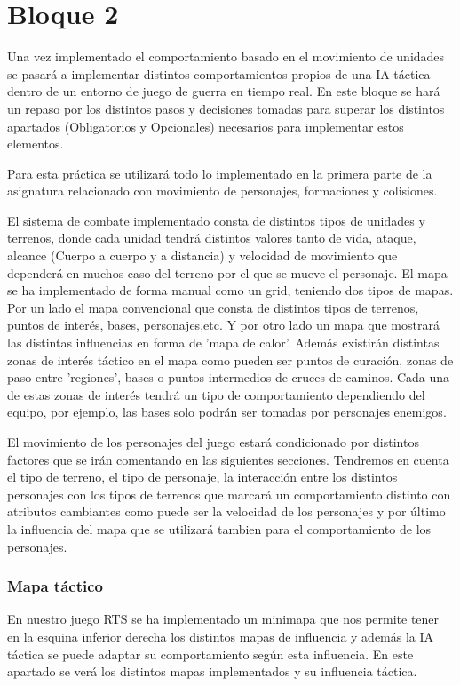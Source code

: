 \part{Bloque 2}

 Una vez implementado el comportamiento basado  en el movimiento de unidades se pasará a implementar distintos comportamientos propios de una IA táctica dentro de un entorno de juego de guerra en tiempo real.  En este bloque se hará un repaso por los distintos pasos y decisiones tomadas para superar los distintos apartados (Obligatorios y Opcionales) necesarios para implementar estos elementos.

Para esta práctica se utilizará todo lo implementado en la primera parte de la asignatura relacionado con movimiento de personajes, formaciones y colisiones.

El sistema de combate implementado consta de distintos tipos de unidades y terrenos, donde cada unidad tendrá distintos valores tanto de vida, ataque, alcance (Cuerpo a cuerpo y a distancia) y velocidad de movimiento que dependerá en muchos caso del terreno por el que se mueve el personaje. El mapa se ha implementado de forma manual como un grid, teniendo dos tipos de mapas. Por un lado el mapa convencional que consta de distintos tipos de terrenos, puntos de interés, bases, personajes,etc. Y por otro lado un mapa que mostrará las distintas influencias en forma de 'mapa de calor'.
Además  existirán distintas zonas de interés táctico en el mapa como pueden ser puntos de curación, zonas de paso entre 'regiones', bases o puntos intermedios de cruces de caminos. Cada una de estas zonas de interés tendrá un tipo de comportamiento dependiendo del equipo, por ejemplo, las bases solo podrán ser tomadas por personajes enemigos.

El movimiento de los personajes del juego estará condicionado por distintos factores que se irán comentando en las siguientes secciones.
Tendremos en cuenta el tipo de terreno, el tipo de personaje, la interacción entre los distintos personajes con los tipos de terrenos que marcará un comportamiento distinto con atributos cambiantes como puede ser la velocidad de los personajes y por último la influencia del mapa que se utilizará tambien para el comportamiento de los personajes.








\section{Mapa táctico}
En nuestro juego RTS se ha implementado un minimapa que nos permite tener en la esquina inferior derecha los distintos mapas de influencia y además la IA táctica se puede adaptar su comportamiento según esta influencia. En este apartado se verá los distintos mapas implementados y su influencia táctica.


